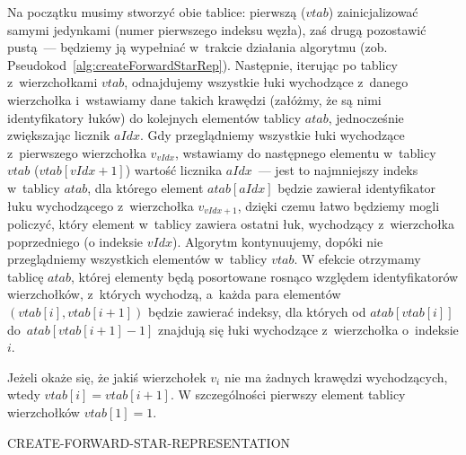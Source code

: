 Na początku musimy stworzyć obie tablice: pierwszą ($vtab$) zainicjalizować samymi jedynkami (numer pierwszego indeksu węzła), zaś drugą pozostawić pustą~--- będziemy ją wypełniać w~trakcie działania algorytmu (zob. Pseudokod~\ref{alg:createForwardStarRep}).
Następnie, iterując po tablicy z~wierzchołkami $vtab$, odnajdujemy wszystkie łuki wychodzące z~danego wierzchołka i~wstawiamy dane takich krawędzi (załóżmy, że są nimi identyfikatory łuków) do kolejnych elementów tablicy $atab$, jednocześnie zwiększając licznik $aIdx$.
Gdy przeglądniemy wszystkie łuki wychodzące z~pierwszego wierzchołka $v_{vIdx}$, wstawiamy do następnego elementu w~tablicy $vtab$ ($vtab \left[ vIdx+1 \right]$) wartość licznika $aIdx$~--- jest to najmniejszy indeks w~tablicy $atab$, dla którego element $atab \left[ aIdx \right]$ będzie zawierał identyfikator łuku wychodzącego z~wierzchołka $v_{vIdx+1}$, dzięki czemu łatwo będziemy mogli policzyć, który element w~tablicy zawiera ostatni łuk, wychodzący z~wierzchołka poprzedniego (o indeksie $vIdx$).
Algorytm kontynuujemy, dopóki nie przeglądniemy wszystkich elementów w~tablicy $vtab$.
W efekcie otrzymamy tablicę $atab$, której elementy będą posortowane rosnąco względem identyfikatorów wierzchołków, z~których wychodzą, a~każda para elementów $\left( vtab \left[ i \right], vtab \left[ i+1 \right] \right)$ będzie zawierać indeksy, dla których od $atab \left[ vtab \left[ i \right] \right]$ do~$atab \left[ vtab \left[ i+1 \right] -1 \right]$ znajdują się łuki wychodzące z~wierzchołka o~indeksie $i$.

Jeżeli okaże się, że jakiś wierzchołek $v_{i}$ nie ma żadnych krawędzi wychodzących, wtedy $vtab \left[ i \right] = vtab \left[ i+1 \right]$.
W szczególności pierwszy element tablicy wierzchołków $vtab \left[ 1 \right] = 1$.

\begin{pseudokod}[!htbp]
	\DontPrintSemicolon
	\caption{CREATE-FORWARD-STAR-REPRESENTATION\label{alg:cfsr}}
	\label{alg:createForwardStarRep}
\end{pseudokod}



